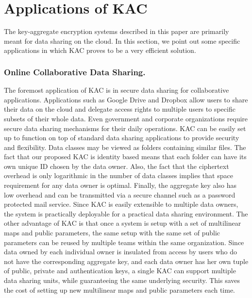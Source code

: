 \section{Applications of KAC}
\label{sec:applications}

The key-aggregate encryption systems described in this paper are primarily meant for data sharing on the cloud. In this section, we point out some specific applications in which KAC proves to be a very efficient solution.

\subsubsection{Online Collaborative Data Sharing.} The foremost application of KAC is in secure data sharing for collaborative applications. Applications such as Google Drive \cite{googledrive} and Dropbox \cite{dropbox} allow users to share their data on the cloud and delegate access rights to multiple users to specific subsets of their whole data. Even government and corporate organizations require secure data sharing mechanisms for their daily operations. KAC can be easily set up to function on top of standard data sharing applications to provide security and flexibility. Data classes may be viewed as folders containing similar files. The fact that our proposed KAC is identity based means that each folder can have its own unique ID chosen by the data owner. Also, the fact that the ciphertext overhead is only logarithmic in the number of data classes implies that space requirement for any data owner is optimal. Finally, the aggregate key also has low overhead and can be transmitted via a secure channel such as a password protected mail service. Since KAC is easily extensible to multiple data owners, the system is practically deployable for a practical data sharing environment. The other advantage of KAC is that once a system is setup with a set of multilinear maps and public parameters, the same setup with the same set of public parameters can be reused by multiple teams within the same organization. Since data owned by each individual owner is insulated from access by users who do not have the corresponding aggregate key, and each data owner has her own tuple of public, private and authentication keys, a single KAC can support multiple data sharing units, while guaranteeing the same underlying security. This saves the cost of setting up new multilinear maps and public parameters each time. 

